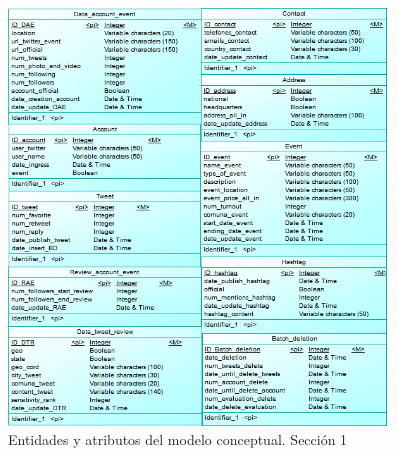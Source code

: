 \documentclass{memoria}
\begin{document}
\begin{figure}[!ht]
\begin{center}
\includegraphics[width=0.9\textwidth]{img/tablaconceptual2.png}
\caption{Entidades y atributos del modelo conceptual. Sección 1}
\end{center}
\end{figure}
\end{document}
